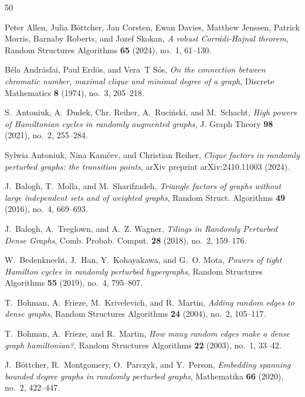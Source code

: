 \documentclass[reqno, 12pt]{amsart}
\numberwithin{equation}{section}
\numberwithin{figure}{section}
\theoremstyle{plain}
\theoremstyle{definition}
\begin{document}
	
	\begin{thebibliography}{50}

Peter Allen, Julia B\"ottcher, Jan Corsten, Ewan Davies, Matthew Jenssen, Patrick Morris, Barnaby Roberts, and Jozef Skokan, \emph{A robust {C}orr\'adi-{H}ajnal theorem}, Random Structures Algorithms \textbf{65} (2024), no.~1, 61--130. 

B{\'e}la Andr{\'a}sfai, Paul Erd{\"o}s, and Vera~T S{\'o}s, \emph{On the connection between chromatic number, maximal clique and minimal degree of a graph}, Discrete Mathematics \textbf{8} (1974), no.~3, 205--218.

S.~Antoniuk, A.~Dudek, Chr. Reiher, A.~Ruci\'{n}ski, and M.~Schacht, \emph{High powers of {H}amiltonian cycles in randomly augmented graphs}, J. Graph Theory \textbf{98} (2021), no.~2, 255--284. 

Sylwia Antoniuk, Nina Kam{\v{c}}ev, and Christian Reiher, \emph{Clique factors in randomly perturbed graphs: the transition points}, arXiv preprint arXiv:2410.11003 (2024).

J.~Balogh, T.~Molla, and M.~Sharifzadeh, \emph{Triangle factors of graphs without large independent sets and of weighted graphs}, Random Struct. Algorithms \textbf{49} (2016), no.~4, 669--693. 

J.~Balogh, A.~Treglown, and A.~Z. Wagner, \emph{Tilings in {R}andomly {P}erturbed {D}ense {G}raphs}, Comb. Probab. Comput. \textbf{28} (2018), no.~2, 159--176.

W.~Bedenknecht, J.~Han, Y.~Kohayakawa, and G.~O. Mota, \emph{Powers of tight {H}amilton cycles in randomly perturbed hypergraphs}, Random Structures Algorithms \textbf{55} (2019), no.~4, 795--807. 

T.~Bohman, A.~Frieze, M.~Krivelevich, and R.~Martin, \emph{Adding random edges to dense graphs}, Random Structures Algorithms \textbf{24} (2004), no.~2, 105--117. 

T.~Bohman, A.~Frieze, and R.~Martin, \emph{How many random edges make a dense graph hamiltonian?}, Random Structures Algorithms \textbf{22} (2003), no.~1, 33--42.

J.~B\"{o}ttcher, R.~Montgomery, O.~Parczyk, and Y.~Person, \emph{Embedding spanning bounded degree graphs in randomly perturbed graphs}, Mathematika \textbf{66} (2020), no.~2, 422--447. 


\end{thebibliography}
\end{document}
